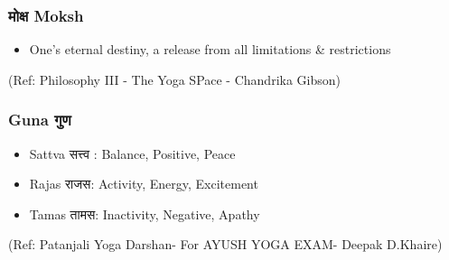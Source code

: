 \begin{frame}[fragile]\frametitle{ मोक्ष Moksh}

	\begin{itemize}
	\item One's eternal destiny, a release from all limitations \& restrictions
	\end{itemize}

\tiny{(Ref: Philosophy III - The Yoga SPace - Chandrika Gibson)}

\end{frame}

\begin{frame}[fragile]\frametitle{Guna गुण}

	\begin{itemize}
	\item Sattva सत्त्व : Balance, Positive, Peace
	\item Rajas राजस: Activity, Energy, Excitement
	\item Tamas तामस: Inactivity, Negative, Apathy

	\end{itemize}

  
  \tiny{(Ref: Patanjali Yoga Darshan- For AYUSH YOGA EXAM- Deepak D.Khaire)}

\end{frame}